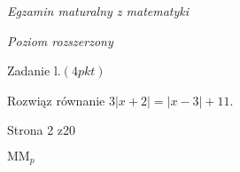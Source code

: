 \documentclass[a4paper,12pt]{article}
\begin{document}
{\it Egzamin maturalny z matematyki}

{\it Poziom rozszerzony}

Zadanie l.$(4pkt)$

Rozwiąz równanie $3|x+2|=|x-3|+11.$

Strona 2 z20

$\mathrm{M}\mathrm{M}_{p}$
\end{document}
